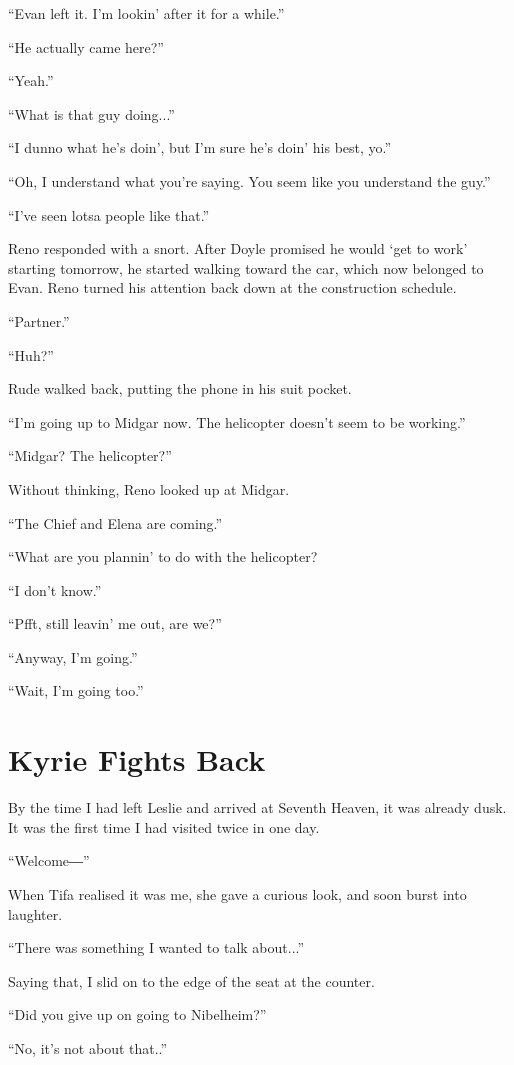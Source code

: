 \documentclass[oneside]{book}
\begin{document}
“Evan left it. I’m lookin’ after it for a while.”

“He actually came here?”

“Yeah.”

“What is that guy doing...”

“I dunno what he’s doin’, but I’m sure he’s doin’ his best, yo.”

“Oh, I understand what you’re saying. You seem like you understand the guy.”

“I’ve seen lotsa people like that.”

Reno responded with a snort. After Doyle promised he would ‘get to work’ starting tomorrow, he started walking toward the car, which now belonged to Evan. Reno turned his attention back down at the construction schedule.

“Partner.”

“Huh?”

Rude walked back, putting the phone in his suit pocket.

“I’m going up to Midgar now. The helicopter doesn’t seem to be working.”

“Midgar? The helicopter?”

Without thinking, Reno looked up at Midgar.

“The Chief and Elena are coming.”

“What are you plannin’ to do with the helicopter?

“I don’t know.”

“Pfft, still leavin’ me out, are we?”

“Anyway, I’m going.”

“Wait, I’m going too.”

\chapter{Kyrie Fights Back}
By the time I had left Leslie and arrived at Seventh Heaven, it was already dusk. It was the first time I had visited twice in one day.

“Welcome―”

When Tifa realised it was me, she gave a curious look, and soon burst into laughter.

“There was something I wanted to talk about...”

Saying that, I slid on to the edge of the seat at the counter.

“Did you give up on going to Nibelheim?”

“No, it’s not about that..”
\end{document}
